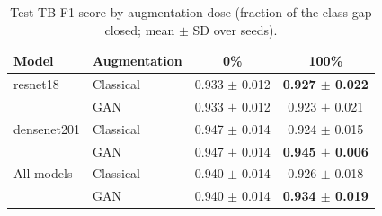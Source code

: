 \begin{table}[htbp]
\centering
\caption{Test TB F1-score by augmentation dose (fraction of the class gap closed; mean $\pm$ SD over seeds).}
\label{tab:dose_tb_f1}
\begin{tabular}{llcc}
\toprule
Model & Augmentation & 0\% & 100\% \\
\midrule
resnet18 & Classical & 0.933 $\pm$ 0.012 & \textbf{0.927 $\pm$ 0.022} \\
 & GAN & 0.933 $\pm$ 0.012 & 0.923 $\pm$ 0.021 \\
\addlinespace
densenet201 & Classical & 0.947 $\pm$ 0.014 & 0.924 $\pm$ 0.015 \\
 & GAN & 0.947 $\pm$ 0.014 & \textbf{0.945 $\pm$ 0.006} \\
\addlinespace
All models & Classical & 0.940 $\pm$ 0.014 & 0.926 $\pm$ 0.018 \\
 & GAN & 0.940 $\pm$ 0.014 & \textbf{0.934 $\pm$ 0.019} \\
\bottomrule
\end{tabular}
\end{table}